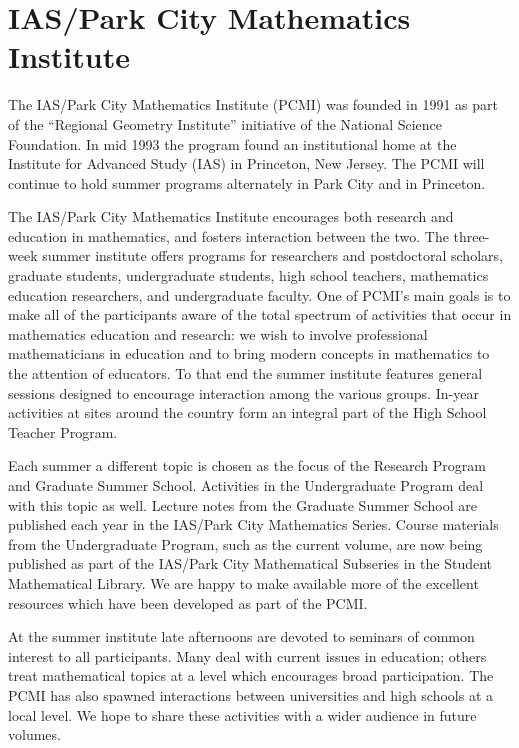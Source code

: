 \documentclass{stml-l}
\theoremstyle{definition}
\numberwithin{equation}{chapter}
\numberwithin{figure}{chapter}
\numberwithin{figure}{section}
\begin{document}
\frontmatter

\tableofcontents

\chapter*{IAS/Park City Mathematics Institute}

The IAS/Park City Mathematics Institute (PCMI) was founded in 1991 as part of the ``Regional Geometry Institute'' initiative of the National Science Foundation. In mid 1993 the program found an institutional home at the Institute for Advanced Study (IAS) in Princeton, New Jersey. The PCMI will continue to hold summer programs alternately in Park City and in Princeton.

The IAS/Park City Mathematics Institute encourages both research and education in mathematics, and fosters interaction between the two. The three-week summer institute offers programs for researchers and postdoctoral scholars, graduate students, undergraduate students, high school teachers, mathematics education researchers, and undergraduate faculty. One of PCMI's main goals is to make all of the participants aware of the total spectrum of activities that occur in mathematics education and research: we wish to involve professional mathematicians in education and to bring modern concepts in mathematics to the attention of educators. To that end the summer institute features general sessions designed to encourage interaction among the various groups. In-year activities at sites around the country form an integral part of the High School Teacher Program.

Each summer a different topic is chosen as the focus of the Research Program and Graduate Summer School. Activities in the Undergraduate Program deal with this topic as well. Lecture notes from the Graduate Summer School are published each year in the IAS/Park City Mathematics Series. Course materials from the Undergraduate Program, such as the current volume, are now being published as part of the IAS/Park City Mathematical Subseries in the Student Mathematical Library. We are happy to make available more of the excellent resources which have been developed as part of the PCMI.

At the summer institute late afternoons are devoted to seminars of common interest to all participants. Many deal with current issues in education; others treat mathematical topics at a level which encourages broad participation. The PCMI has also spawned interactions between universities and high schools at a local level. We hope to share these activities with a wider audience in future volumes.\\
\end{document}
